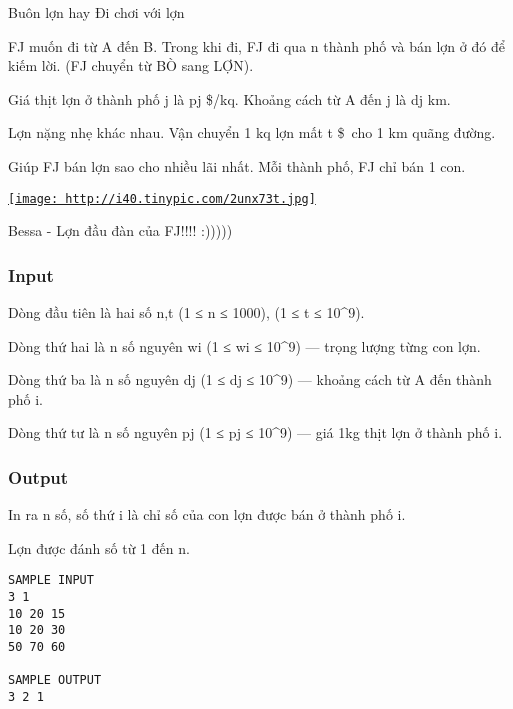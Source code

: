 

Buôn lợn hay Đi chơi với lợn

FJ muốn đi từ A đến B. Trong khi đi, FJ đi qua n thành phố và bán lợn ở đó để kiếm lời. (FJ chuyển từ BÒ sang LỢN).


Giá thịt lợn ở thành phố j là pj \$/kq. Khoảng cách từ A đến j là dj km.


Lợn nặng nhẹ khác nhau. Vận chuyển 1 kq lợn mất t \$ cho 1 km quãng đường. 

Giúp FJ bán lợn sao cho nhiều lãi nhất. Mỗi thành phố, FJ chỉ bán 1 con.

\href{http://tinypic.com}{
\texttt{[image: http://i40.tinypic.com/2unx73t.jpg]}}


Bessa - Lợn đầu đàn của FJ!!!! :)))))

\subsubsection{Input}

Dòng đầu tiên là hai số n,t (1 ≤ n ≤ 1000), (1 ≤ t ≤ 10^9).


Dòng thứ hai là n số nguyên wi (1 ≤ wi ≤ 10^9) — trọng lượng từng con lợn.


Dòng thứ ba là n số nguyên dj (1 ≤ dj ≤ 10^9) — khoảng cách từ A đến thành phố i.


Dòng thứ tư là n số nguyên pj (1 ≤ pj ≤ 10^9) — giá 1kg thịt lợn ở thành phố i.

\subsubsection{Output}

In ra n số, số thứ i là chỉ số của con lợn được bán ở thành phố i.


Lợn được đánh số từ 1 đến n.
\begin{verbatim}
SAMPLE INPUT
3 1
10 20 15
10 20 30
50 70 60

SAMPLE OUTPUT
3 2 1\end{verbatim}
